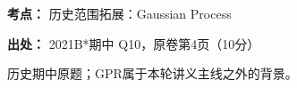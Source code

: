 \textbf{考点：} 历史范围拓展：Gaussian Process


\textbf{出处：} 2021B*期中 Q10，原卷第4页（10分）


历史期中原题；GPR属于本轮讲义主线之外的背景。
